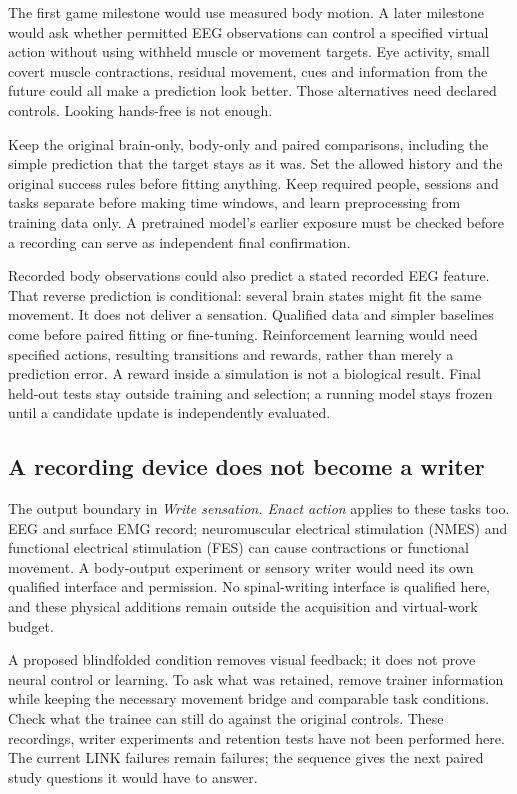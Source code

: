 The first game milestone would use measured body motion. A later milestone would
ask whether permitted EEG observations can control a specified virtual action
without using withheld muscle or movement targets. Eye activity, small covert
muscle contractions, residual movement, cues and information from the future
could all make a prediction look better. Those alternatives need declared
controls. Looking hands-free is not enough.

Keep the original brain-only, body-only and paired comparisons, including the
simple prediction that the target stays as it was. Set the allowed history and
the original success rules before fitting anything. Keep required people,
sessions and tasks separate before making time windows, and learn preprocessing
from training data only. A pretrained model's earlier exposure must be checked
before a recording can serve as independent final confirmation.

Recorded body observations could also predict a stated recorded EEG feature.
That reverse prediction is conditional: several brain states might fit the same
movement. It does not deliver a sensation. Qualified data and simpler baselines
come before paired fitting or fine-tuning. Reinforcement learning would need
specified actions, resulting transitions and rewards, rather than merely a
prediction error. A reward inside a simulation is not a biological result.
Final held-out tests stay outside training and selection; a running model stays
frozen until a candidate update is independently evaluated.

\subsection{A recording device does not become a writer}

The output boundary in \emph{Write sensation. Enact action} applies to these
tasks too. EEG and surface EMG record; neuromuscular electrical stimulation
(NMES) and functional electrical stimulation (FES) can cause contractions or
functional movement. A body-output experiment or sensory writer would need its
own qualified interface and permission. No spinal-writing interface is qualified here,
and these physical additions remain outside the acquisition and virtual-work
budget.

A proposed blindfolded condition removes visual feedback; it does not prove
neural control or learning. To ask what was retained, remove trainer information
while keeping the necessary movement bridge and comparable task conditions.
Check what the trainee can still do against the original controls. These
recordings, writer experiments and retention tests have not been performed
here. The current LINK failures remain failures; the sequence gives the next
paired study questions it would have to answer.
